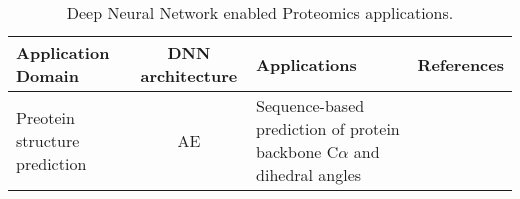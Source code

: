 \begin{table}[h!]
\centering
\begin{tabular}{|| l | c | l | l ||}
    \hline
    Application Domain & DNN architecture & Applications & References\\
    \hline \hline
    Preotein structure prediction & AE & Sequence-based prediction of protein backbone C$\alpha$ and dihedral angles & \\
    
    \hline
\end{tabular}
\caption{Deep Neural Network enabled Proteomics applications.}
\label{tab:PS-DNN}
\end{table}